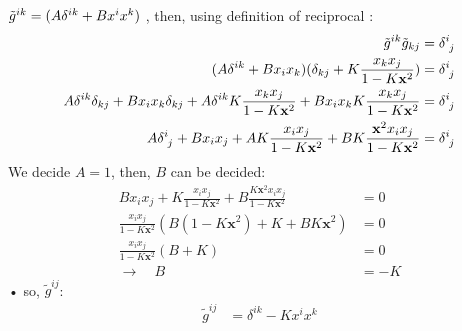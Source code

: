 \documentclass[11pt,a4paper,dvipdfmx]{jsarticle}
\theoremstyle{plain}
\theoremstyle{break}
\newcommand{\mbx}{\mathbf{x}}
\begin{document}
$\tilde{g}^{ik}= (A \tensor{\delta}{^{ik}} + Bx^i x^k)$
, then, using definition of reciprocal :
\begin{align}
\tilde{g}^{ik}\tilde{g}_{kj} &= \tensor{\delta}{^i_j} \\
(A \tensor{\delta}{^{ik}} + Bx_i x_k) (\delta_{kj} + K \frac{x_k x_j}{1- K \mbx^2} ) & =  \tensor{\delta}{^i_j} \\
A \tensor{\delta}{^{ik}} \delta_{kj} + Bx_i x_k \delta_{kj} +A \tensor{\delta}{^{ik}}K \frac{x_k x_j}{1- K \mbx^2} +Bx_i x_k K \frac{x_k x_j}{1- K \mbx^2} & =  \tensor{\delta}{^i_j} \\
A \tensor{\delta}{^{i}_j} + Bx_i x_j  +A K \frac{x_i x_j}{1- K \mbx^2} +BK \frac{\mbx^2 x_i x_j}{1- K \mbx^2} & =  \tensor{\delta}{^i_j}
\end{align}
We decide $A=1$, then, $B$ can be decided:
\begin{align}
Bx_i x_j  + K \frac{x_i x_j}{1- K \mbx^2} +B \frac{ K \mbx^2 x_i x_j}{1- K \mbx^2} & =0\\
\frac{x_i x_j}{1- K\mbx^2}(B(1-K\mbx^2) + K +B K\mbx^2)&=0\\
\frac{x_i x_j}{1- K\mbx^2}(B+K)&=0 \\
\rightarrow \quad B &= -K
\end{align}•%
so, $\tilde{g}^{ij}$:
\begin{align}
\tilde{g}^{ij}
&=\delta^{ik} - K x^i x^k
\end{align}
\end{document}
